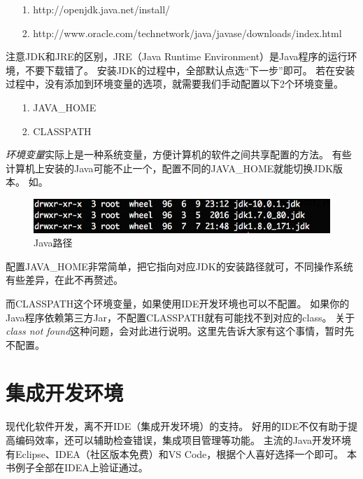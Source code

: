 \begin{itemize}
\item[1.]http://openjdk.java.net/install/
\item[2.]http://www.oracle.com/technetwork/java/javase/downloads/index.html
\end{itemize}

\noindent
注意JDK和JRE的区别，JRE（Java Runtime Environment）是Java程序的运行环境，不要下载错了。
安装JDK的过程中，全部默认点选“下一步”即可。
若在安装过程中，没有添加到环境变量的选项，就需要我们手动配置以下2个环境变量。

\begin{itemize}
\item[1.]JAVA\_HOME
\item[2.]CLASSPATH
\end{itemize}

\emph{环境变量}实际上是一种系统变量，方便计算机的软件之间共享配置的方法。
有些计算机上安装的Java可能不止一个，配置不同的JAVA\_HOME就能切换JDK版本。
如。

\begin{figure}[!htb]
\centerline{\includegraphics{images/java_home.png}}
\label{fig:part1_java_home}
\caption{Java路径}
\end{figure}

配置JAVA\_HOME非常简单，把它指向对应JDK的安装路径就可，不同操作系统有些差异，在此不再赘述。

而CLASSPATH这个环境变量，如果使用IDE开发环境也可以不配置。
如果你的Java程序依赖第三方Jar，不配置CLASSPATH就有可能找不到对应的class。
关于\emph{class not found}这种问题，会对此进行说明。这里先告诉大家有这个事情，暂时先不配置。

\section{集成开发环境}
现代化软件开发，离不开IDE（集成开发环境）的支持。
好用的IDE不仅有助于提高编码效率，还可以辅助检查错误，集成项目管理等功能。
主流的Java开发环境有Eclipse、IDEA（社区版本免费）和VS Code，根据个人喜好选择一个即可。
本书例子全部在IDEA上验证通过。

